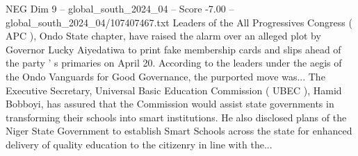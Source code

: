 \begin{textsample}{NEG Dim 9 – global\_south\_2024\_04 – Score -7.00 – global\_south\_2024\_04/107407467.txt}
Leaders of the All Progressives Congress ( APC ), Ondo State chapter, have raised the alarm over an alleged plot by Governor Lucky Aiyedatiwa to print fake membership cards and slips ahead of the party ' s primaries on April 20.
According to the leaders under the aegis of the Ondo Vanguards for Good Governance, the purported move was...
The Executive Secretary, Universal Basic Education Commission ( UBEC ), Hamid Bobboyi, has assured that the Commission would assist state governments in transforming their schools into smart institutions.
He also disclosed plans of the Niger State Government to establish Smart Schools across the state for enhanced delivery of quality education to the citizenry in line with the...

\end{textsample}
